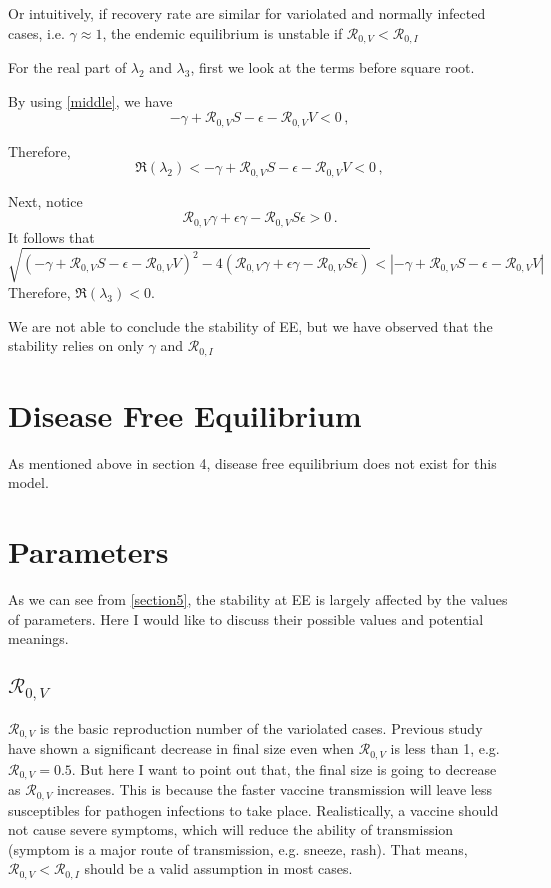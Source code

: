 \documentclass[12pt]{article}
\newcommand{\R}{\mathcal{R}}
\begin{document}
Or intuitively, if recovery rate are similar for variolated and normally infected cases, i.e. $\gamma\approx 1$, the endemic equilibrium is unstable if $\R_{0,V}<\R_{0,I}$

For the real part of $\lambda_2$ and $\lambda_3$, first we look at the terms before square root. 

By using \autoref{middle}, we have
\begin{equation}
-\gamma+\R_{0,V}S-\epsilon-\R_{0,V}V<0\,,
\end{equation}

Therefore,
\begin{equation}
\Re(\lambda_2)<-\gamma+\R_{0,V}S-\epsilon-\R_{0,V}V<0\,,
\end{equation}

Next, notice
\begin{equation}
\R_{0,V}\gamma+\epsilon\gamma-\R_{0,V}S\epsilon>0\,.
\end{equation}
It follows that
\begin{equation}
\sqrt{(-\gamma+\R_{0,V} S-\epsilon-\R_{0,V}V)^2-4(\R_{0,V}\gamma+\epsilon\gamma-\R_{0,V}S\epsilon)}<|-\gamma+\R_{0,V} S-\epsilon-\R_{0,V}V|
\end{equation}
Therefore, $\Re(\lambda_3)<0$.

We are not able to conclude the stability of EE, but we have observed that the stability relies on only $\gamma$ and $\R_{0,I}$
\section{Disease Free Equilibrium}
As mentioned above in section 4, disease free equilibrium does not exist for this model.
\section{Parameters}
As we can see from \autoref{section5}, the stability at EE is largely affected by the values of parameters. Here I would like to discuss their possible values and potential meanings.
\subsection{$\R_{0,V}$}
$\R_{0,V}$ is the basic reproduction number of the variolated cases. Previous study have shown a significant decrease in final size even when $\R_{0,V}$ is less than 1, e.g. $\R_{0,V}=0.5$. But here I want to point out that, the final size is going to decrease as $\R_{0,V}$ increases. This is because the faster vaccine transmission will leave less susceptibles for pathogen infections to take place. Realistically, a vaccine should not cause severe symptoms, which will reduce the ability of transmission (symptom is a major route of transmission, e.g. sneeze, rash). That means, $\R_{0,V}<\R_{0,I}$ should be a valid assumption in most cases. 
\end{document}

